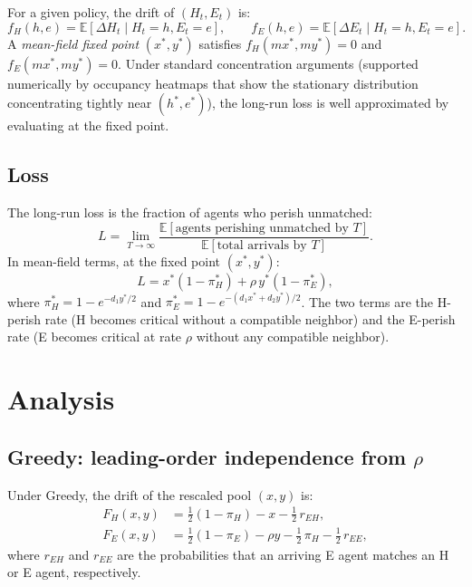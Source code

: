 \documentclass{article}
\theoremstyle{plain}
\theoremstyle{definition}
\newcommand{\E}{\mathbb{E}}
\begin{document}
For a given policy, the drift of $(H_t,E_t)$ is:
\[
  f_H(h,e)=\E[\Delta H_t\mid H_t=h,E_t=e],\qquad
  f_E(h,e)=\E[\Delta E_t\mid H_t=h,E_t=e].
\]
A \emph{mean-field fixed point} $(x^*,y^*)$ satisfies
$f_H(mx^*,my^*)=0$ and $f_E(mx^*,my^*)=0$.  Under standard concentration
arguments (supported numerically by occupancy heatmaps that show the
stationary distribution concentrating tightly near $(h^*,e^*)$), the
long-run loss is well approximated by evaluating at the fixed point.

\subsection{Loss}

The long-run loss is the fraction of agents who perish unmatched:
\begin{equation}\label{eq:loss-def}
  L
  =\lim_{T\to\infty}
    \frac{\E[\text{agents perishing unmatched by }T]}
         {\E[\text{total arrivals by }T]}.
\end{equation}
In mean-field terms, at the fixed point $(x^*,y^*)$:
\begin{equation}\label{eq:loss-mf}
  L = x^*(1-\pi_H^*) + \rho\,y^*(1-\pi_E^*),
\end{equation}
where $\pi_H^*=1-e^{-d_1 y^*/2}$ and $\pi_E^*=1-e^{-(d_1 x^*+d_2 y^*)/2}$.
The two terms are the H-perish rate (H becomes critical without a compatible
neighbor) and the E-perish rate (E becomes critical at rate $\rho$ without
any compatible neighbor).

\section{Analysis}
\label{sec:mf}

\subsection{Greedy: leading-order independence from $\rho$}
\label{sec:greedy-rho}

Under Greedy, the drift of the rescaled pool $(x,y)$ is:
\begin{align}
  F_H(x,y) &= \tfrac{1}{2}(1-\pi_H) - x - \tfrac{1}{2}\,r_{EH},
    \label{eq:greedy-drift-H}\\
  F_E(x,y) &= \tfrac{1}{2}(1-\pi_E) - \rho y - \tfrac{1}{2}\,\pi_H
               - \tfrac{1}{2}\,r_{EE},
    \label{eq:greedy-drift-E}
\end{align}
where $r_{EH}$ and $r_{EE}$ are the probabilities that an arriving E agent
matches an H or E agent, respectively.
\end{document}
